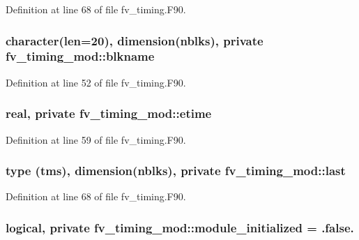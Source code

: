Definition at line 68 of file fv\-\_\-timing.\-F90.

\subsubsection[{blkname}]{\setlength{\rightskip}{0pt plus 5cm}character(len=20), dimension({\bf nblks}), private fv\-\_\-timing\-\_\-mod\-::blkname\hspace{0.3cm}{\ttfamily [private]}}\label{classfv__timing__mod_a31560d7c7691483d291cebc1466fbbef}


Definition at line 52 of file fv\-\_\-timing.\-F90.

\subsubsection[{etime}]{\setlength{\rightskip}{0pt plus 5cm}real, private fv\-\_\-timing\-\_\-mod\-::etime\hspace{0.3cm}{\ttfamily [private]}}\label{classfv__timing__mod_add9c7186606182a5850e936cc88bf664}


Definition at line 59 of file fv\-\_\-timing.\-F90.

\subsubsection[{last}]{\setlength{\rightskip}{0pt plus 5cm}type ({\bf tms}), dimension({\bf nblks}), private fv\-\_\-timing\-\_\-mod\-::last\hspace{0.3cm}{\ttfamily [private]}}\label{classfv__timing__mod_aef40c4c1d0162a76cde3d6461a46d91b}


Definition at line 68 of file fv\-\_\-timing.\-F90.

\subsubsection[{module\-\_\-initialized}]{\setlength{\rightskip}{0pt plus 5cm}logical, private fv\-\_\-timing\-\_\-mod\-::module\-\_\-initialized = .false.\hspace{0.3cm}{\ttfamily [private]}}\label{classfv__timing__mod_aa0f0480c2acfb9198a47a6bfd90e91c7}


